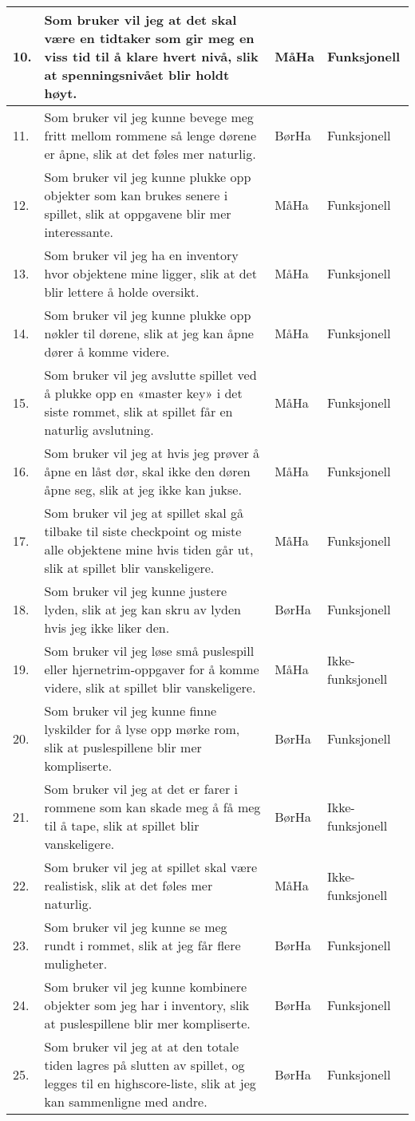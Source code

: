 \documentclass[norsk,a4paper]{article}
\begin{document}
\begin{center}
\begin{tabular}{ | m{0.4cm} | m{6.5cm} | m{2cm} | m{3cm} | }
\hline
10. & Som bruker vil jeg at det skal være en tidtaker som gir meg en viss tid til å klare hvert nivå, slik at spenningsnivået blir holdt høyt. & MåHa & Funksjonell
\\ \hline
11. & Som bruker vil jeg kunne bevege meg fritt mellom rommene så lenge dørene er åpne, slik at det føles mer naturlig. & BørHa & Funksjonell
\\ \hline
12. & Som bruker vil jeg kunne plukke opp objekter som kan brukes senere i spillet, slik at oppgavene blir mer interessante. & MåHa & Funksjonell
\\ \hline
13. & Som bruker vil jeg ha en inventory hvor objektene mine ligger, slik at det blir lettere å holde oversikt. & MåHa & Funksjonell
\\ \hline
14. & Som bruker vil jeg kunne plukke opp nøkler til dørene, slik at jeg kan åpne dører å komme videre. & MåHa & Funksjonell
\\ \hline
15. & Som bruker vil jeg avslutte spillet ved å plukke opp en «master key» i det siste rommet, slik at spillet får en naturlig avslutning. & MåHa & Funksjonell
\\ \hline
16. & Som bruker vil jeg at hvis jeg prøver å åpne en låst dør, skal ikke den døren åpne seg, slik at jeg ikke kan jukse. & MåHa & Funksjonell
\\ \hline
17. & Som bruker vil jeg at spillet skal gå tilbake til siste checkpoint og miste alle objektene mine hvis tiden går ut, slik at spillet blir vanskeligere. & MåHa & Funksjonell
\\ \hline
18. & Som bruker vil jeg kunne justere lyden, slik at jeg kan skru av lyden hvis jeg ikke liker den. & BørHa & Funksjonell
\\ \hline
19. & Som bruker vil jeg løse små puslespill eller hjernetrim-oppgaver for å komme videre, slik at spillet blir vanskeligere. & MåHa & Ikke-funksjonell
\\ \hline
20. & Som bruker vil jeg kunne finne lyskilder for å lyse opp mørke rom, slik at puslespillene blir mer kompliserte. & BørHa & Funksjonell
\\ \hline
21. & Som bruker vil jeg at det er farer i rommene som kan skade meg å få meg til å tape, slik at spillet blir vanskeligere. & BørHa & Ikke-funksjonell
\\ \hline
22. & Som bruker vil jeg at spillet skal være realistisk, slik at det føles mer naturlig. & MåHa & Ikke-funksjonell
\\ \hline
23. & Som bruker vil jeg kunne se meg rundt i rommet, slik at jeg får flere muligheter. & BørHa & Funksjonell
\\ \hline
24. & Som bruker vil jeg kunne kombinere objekter som jeg har i inventory, slik at puslespillene blir mer kompliserte. & BørHa & Funksjonell
\\ \hline
25. & Som bruker vil jeg at at den totale tiden lagres på slutten av spillet, og legges til en highscore-liste, slik at jeg kan sammenligne med andre. & BørHa & Funksjonell
\\ \hline
\end{tabular}
\end{center}
\end{document}
